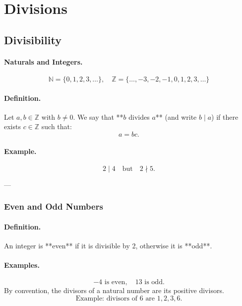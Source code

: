 

\section{Divisions}

\subsection{Divisibility}

\paragraph{Naturals and Integers.}
\[
\mathbb{N} = \{0, 1, 2, 3, \ldots\}, \quad
\mathbb{Z} = \{\ldots, -3, -2, -1, 0, 1, 2, 3, \ldots\}
\]

\paragraph{Definition.}
Let \( a, b \in \mathbb{Z} \) with \( b \neq 0 \).  
We say that **\( b \) divides \( a \)** (and write \( b \mid a \)) if there exists \( c \in \mathbb{Z} \) such that:
\[
a = bc.
\]

\paragraph{Example.}
\[
2 \mid 4 \quad \text{but} \quad 2 \nmid 5.
\]

---

\subsubsection{Even and Odd Numbers}

\paragraph{Definition.}
An integer is **even** if it is divisible by 2, otherwise it is **odd**.

\paragraph{Examples.}
\[
-4 \text{ is even}, \quad 13 \text{ is odd.}
\]
By convention, the divisors of a natural number are its positive divisors.  
\[
\text{Example: divisors of } 6 \text{ are } 1, 2, 3, 6.
\]

